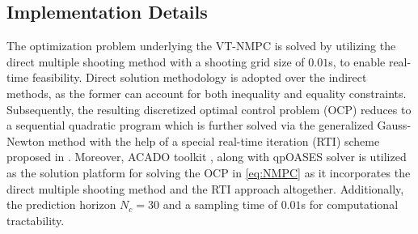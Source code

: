 \documentclass[letterpaper, 10 pt, conference]{ieeeconf}  %
\begin{document}
\subsection{Implementation Details}
The optimization problem underlying the \ac{VT-NMPC} is solved by utilizing the direct multiple shooting method with a shooting grid size of $0.01$s, to enable real-time feasibility. Direct solution methodology is adopted over the indirect methods, as the former can account for both inequality and equality constraints. Subsequently, the resulting discretized optimal control problem (OCP) reduces to a sequential quadratic program which is further solved via the generalized Gauss-Newton method with the help of a special real-time iteration (RTI) scheme proposed in \cite{DIEHL2002577}. Moreover, ACADO toolkit \cite{acado}, along with qpOASES solver %
is utilized as the solution platform for solving the OCP in \eqref{eq:NMPC}
as it incorporates the direct multiple shooting method and the RTI approach altogether. Additionally, the prediction horizon $N_c = 30$ and a sampling time of $0.01$s for computational tractability.
\end{document}
